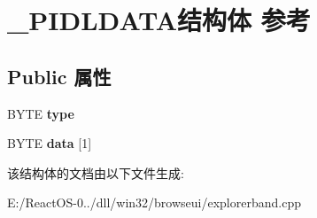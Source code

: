 \hypertarget{struct___p_i_d_l_d_a_t_a}{}\section{\+\_\+\+P\+I\+D\+L\+D\+A\+T\+A结构体 参考}
\label{struct___p_i_d_l_d_a_t_a}
\subsection*{Public 属性}
\begin{DoxyCompactItemize}
\item 
\mbox{\label{struct___p_i_d_l_d_a_t_a_aeeb75899cbfa6c67e95f7e89a232b5bf}} 
B\+Y\+TE {\bfseries type}
\item 
\mbox{\label{struct___p_i_d_l_d_a_t_a_aa3577cdd84cb2965bbc7e2d52c3fe6a5}} 
B\+Y\+TE {\bfseries data} \mbox{[}1\mbox{]}
\end{DoxyCompactItemize}


该结构体的文档由以下文件生成\+:\begin{DoxyCompactItemize}
\item 
E\+:/\+React\+O\+S-\/0../dll/win32/browseui/explorerband.\+cpp\end{DoxyCompactItemize}
